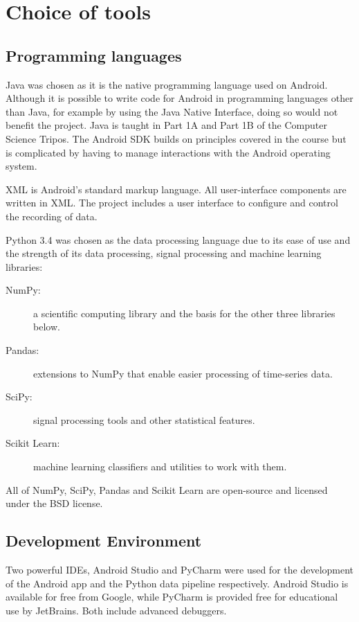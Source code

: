   \section{Choice of tools}
    \subsection{Programming languages}
      \label{sec:programming_languages}
      Java was chosen as it is the native programming language used on Android. Although it is
      possible to write code for Android in programming languages other than Java, for example 
      by using the Java Native Interface, doing so would not benefit the project. Java is taught in
      Part 1A and Part 1B of the Computer Science Tripos. The Android SDK builds on principles
      covered in the course but is complicated by having to manage interactions with the Android operating system.
      
      XML is Android's standard markup language. All user-interface components are written in XML.
      The project includes a user interface to configure and control the recording of data.
      
      Python 3.4 was chosen as the data processing language due to its ease of use and the strength of its data processing, signal processing and machine learning libraries:
      \begin{description}
        \item[NumPy:] a scientific computing library and the basis for the other three libraries below.
        \item[Pandas:] extensions to NumPy that enable easier processing of time-series data.
        \item[SciPy:] signal processing tools and other statistical features.
        \item[Scikit Learn:] machine learning classifiers and utilities to work with them.
      \end{description}
      All of NumPy, SciPy, Pandas and Scikit Learn are open-source and licensed under the BSD license.
    \subsection{Development Environment}
      Two powerful IDEs, Android Studio and PyCharm were used for the development of the Android app and the Python data pipeline respectively. Android Studio is available for free from Google, while PyCharm is provided free for educational use by JetBrains. Both include advanced debuggers.
      
